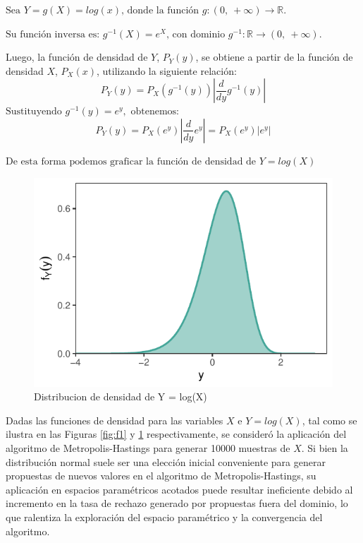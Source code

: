 \documentclass[
]{article}
\begin{document}
\(\text{Sea }Y = g(X) = log(x) \text{, donde la función } g:(0,\ +\infty) \rightarrow \mathbb{R}.\)

\(\text{Su función inversa es: }g^{-1}(X) = e^{X} \text{, con dominio } g^{-1}: \mathbb{R} \rightarrow (0,\ +\infty).\)

Luego, la función de densidad de \(Y\), \(P_Y(y)\), se obtiene a partir de
la función de densidad \(X\), \(P_X(x)\), utilizando la siguiente relación:
\vspace{0cm}
\[P_Y(y) = P_X(g^{-1}(y)) \left| \frac{d}{dy} g^{-1}(y) \right|\]
\(\text{Sustituyendo } g^{-1}(y) = e^{y}, \text{ obtenemos:}\)
\vspace{0cm}
\[P_Y(y) = P_X(e^{y}) \left| \frac{d}{dy} e^{y} \right| = P_X(e^{y})\left| e^{y} \right|\]

\newpage

\(\text{De esta forma podemos graficar la función de densidad de } Y = log(X)\)

\begin{figure}

{\centering \includegraphics{TP-2---El-Dibu-de-la-vida_files/figure-latex/f2-1} 

}

\caption{Distribucion de densidad de Y = log(X)}\label{fig:f2}
\end{figure}

Dadas las funciones de densidad para las variables \(X\) e \(Y=log(X)\), tal
como se ilustra en las Figuras \ref{fig:f1} y \ref{fig:f2}
respectivamente, se consideró la aplicación del algoritmo de
Metropolis-Hastings para generar 10000 muestras de \(X\). Si bien la
distribución normal suele ser una elección inicial conveniente para
generar propuestas de nuevos valores en el algoritmo de
Metropolis-Hastings, su aplicación en espacios paramétricos acotados
puede resultar ineficiente debido al incremento en la tasa de rechazo
generado por propuestas fuera del dominio, lo que ralentiza la
exploración del espacio paramétrico y la convergencia del algoritmo.
\end{document}
